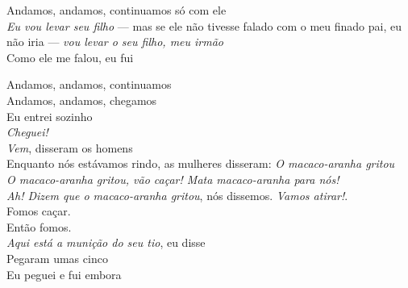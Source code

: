  \smallskip
 \begin{center}\end{center}
 \smallskip
 
\noindent   Andamos, andamos, continuamos só com ele\\
  \textit{Eu vou levar seu filho} --- mas se ele não tivesse falado com o meu finado pai, eu não iria --- \textit{vou levar o seu filho, meu irmão}\\
  Como ele me falou, eu fui
 
 \smallskip
 \begin{center}\end{center}
 \smallskip
 
\noindent   Andamos, andamos, continuamos\\
  Andamos, andamos, chegamos\\
  Eu entrei sozinho\\
  \textit{Cheguei!}\\
  \textit{Vem}, disseram os homens\\
  Enquanto nós estávamos rindo, as mulheres disseram: \textit{O macaco-aranha gritou}\\
  \textit{O macaco-aranha gritou, vão caçar! Mata macaco-aranha para nós!}\\
  \textit{Ah! Dizem que o macaco-aranha gritou}, nós dissemos. \textit{Vamos atirar!}.\\
  Fomos caçar.\\
  Então fomos.\\
  \textit{Aqui está a munição do seu tio}, eu disse\\
  Pegaram umas cinco\\
  Eu peguei e fui embora

